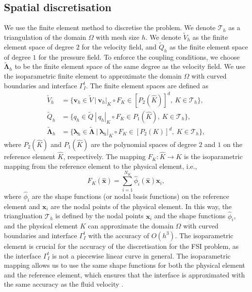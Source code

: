 \documentclass{article}
\newcommand{\bx}{{\mathbf{x}}}
\newcommand{\bv}{{\mathbf{v}}}
\begin{document}
\subsection{Spatial discretisation}
We use the finite element method to discretise the problem. We denote $\mathcal{T}_h$ as a triangulation of the domain $\Omega$ with mesh size $h$. We denote $\tilde{V}_h$ as the finite element space of degree $2$ for the velocity field, and $\tilde{Q}_h$ as the finite element space of degree $1$ for the pressure field. To enforce the coupling conditions, we choose $\tilde{\boldsymbol{\Lambda}}_h$ to be the finite element space of the same degree as the velocity field. We use the isoparametric finite element to approximate the domain $\Omega$ with curved boundaries and interface $\Gamma_I^t$.
The finite element spaces are defined as
\begin{equation}
    \begin{aligned}
        \tilde{V}_h &= \{ \bv_h\in \tilde{V} ~| ~\bv_h|_K\circ F_K\in [P_2(\hat{K})]^d,\ K\in\mathcal{T}_h\},\\
        \tilde{Q}_h &= \{ q_h\in \tilde{Q} ~| ~q_h|_K\circ F_K\in P_1(\hat{K}),\ K\in\mathcal{T}_h\},\\
        \tilde{\boldsymbol{\Lambda}}_h &= \{ \boldsymbol{\lambda}_h\in \tilde{\boldsymbol{\Lambda}} ~| ~\boldsymbol{\lambda}_h|_K\circ F_K\in [P_2(K)]^d,\ K\in\mathcal{T}_h\},
    \end{aligned}
\end{equation}
where $P_2(\hat{K})$ and $P_1(\hat{K})$ are the polynomial spaces of degree $2$ and $1$ on the reference element $\hat{K}$, respectively. The mapping $F_K:\hat{K}\to K$ is the isoparametric mapping from the reference element to the physical element, i.e., \begin{equation}F_K(\hat{\bx}) = \sum_{i=1}^{N_K} \hat{\phi}_i(\hat{\bx})\mathbf{x}_i,\end{equation} where $\hat{\phi}_i$ are the shape functions (or nodal basis functions) on the reference element and $\mathbf{x}_i$ are the nodal points of the physical element. In this way, the triangluation $\mathcal{T}_h$ is defined by the nodal points $\mathbf{x}_i$ and the shape functions $\hat{\phi}_i$, and the physical element $K$ can approximate the domain $\Omega$ with curved boundaries and interface $\Gamma_I^t$ with the accuracy of $O(h^3)$. The isoparametric element is crucial for the accuracy of the discretisation for the FSI problem, as the interface $\Gamma_I^t$ is not a piecewise linear curve in general. The isoparametric mapping allows us to use the same shape functions for both the physical element and the reference element, which ensures that the interface is approximated with the same accuracy as the fluid velocity \cite{brenner2008mathematical}.
\end{document}
